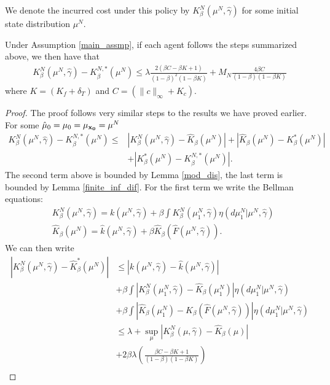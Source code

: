 \documentclass[twoside,11pt]{article}
\begin{document}
We denote the incurred cost under this policy by $K_\beta^N(\mu^N,\hat{\gamma})$ for some initial state distribution $\mu^N$.
\begin{theorem}
Under Assumption \ref{main_assmp}, if each agent follows the steps summarized above, we then have that
\begin{align*}
K_\beta^N(\mu^N,\hat{\gamma}) - K_\beta^{N,*}(\mu^N)\leq \lambda  \frac{2(\beta C - \beta K +1) }{ (1-\beta)^2(1-\beta K)}  + M_N  \frac{4\beta C}{(1-\beta)(1-\beta K)} 
\end{align*}
where $K=(K_f + \delta_T)$ and $C=(\|c\|_\infty + K_c)$.
\end{theorem}
\begin{proof}
The proof follows very similar steps to the results we have proved earlier. 
 For some $\hat{\mu}_0=\mu_0 = \mu_{\bf x_0}=\mu^N$
\begin{align}\label{closed_init_bound}
K_\beta^N(\mu^N,\hat{\gamma}) - K_\beta^{N,*}(\mu^N)  \leq &\left|K_\beta^N(\mu^N,\hat{\gamma}) - \hat{K}_\beta(\mu^N)\right|+ \left|  \hat{K}_\beta(\mu^N) - K^*_\beta(\mu^N)\right| \nonumber\\
&+ \left|  K^*_\beta(\mu^N) - K_\beta^{N,*}(\mu^N) \right|.
\end{align}
The second term above is bounded by Lemma \ref{mod_dis}, the last term is bounded by Lemma \ref{finite_inf_dif}. For the first term we write the Bellman equations:
\begin{align*}
&K_\beta^N(\mu^N,\hat{\gamma})  = k(\mu^N,\hat{\gamma}) + \beta \int K_\beta^{N}(\mu_1^N,\hat{\gamma})\eta(d\mu_1^N|\mu^N,\hat{\gamma})\\
& \hat{K}_\beta(\mu^N) = \hat{k}(\mu^N,\hat{\gamma}) + \beta \hat{K}_\beta \left(\hat{F}(\mu^N,\hat{\gamma})  \right).
\end{align*}
We can then write
\begin{align*}
\left|K_\beta^N(\mu^N,\hat{\gamma}) - \hat{K}^*_\beta(\mu^N)\right|& \leq \left| k(\mu^N,\hat{\gamma}) - \hat{k}(\mu^N,\hat{\gamma})\right|\\
& +  \beta \int \left| K_\beta^{N}(\mu_1^N,\hat{\gamma}) - \hat{K}_\beta (\mu_1^N)\right| \eta(d\mu_1^N|\mu^N,\hat{\gamma})\\
& + \beta \int \left| \hat{K}_\beta (\mu_1^N) - \hat{K}_\beta  \left(\hat{F}(\mu^N,\hat{\gamma})  \right)\right| \eta(d\mu_1^N|\mu^N,\hat{\gamma}) \\
& \leq \lambda + \sup_\mu \left|K_\beta^N(\mu,\hat{\gamma}) - \hat{K}_\beta(\mu)\right| \\
& + 2 \beta  \lambda\left( \frac{\beta C- \beta K +1}{(1-\beta)(1-\beta K)}  \right)\\

\end{align*}
\end{proof}
\end{document}
